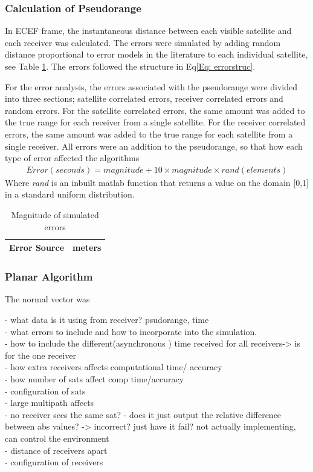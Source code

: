 \subsubsection{Calculation of Pseudorange}
In ECEF frame, the instantaneous distance between each visible satellite and each receiver was calculated. The errors were simulated by adding random distance proportional to error models in the literature to each individual satellite, see Table \ref{Table:mag errors}. The errors followed the structure in Eq\eqref{Eq: errorstruc}.

For the error analysis, the errors associated with the pseudorange were divided into three sections; satellite correlated errors, receiver correlated errors and random errors. For the satellite correlated errors, the same amount was added to the true range for each receiver from a single satellite. For the receiver correlated errors, the same amount was added to the true range for each satellite from a single receiver.  
All errors were an addition to the pseudorange, so that how each type of error affected the algorithms 
\begin{eqnarray}
Error(seconds) = magnitude + 10\times magnitude\times rand(elements) \label{Eq: errorstruc}
\end{eqnarray}
Where \textit{rand} is an inbuilt matlab function that returns a value on the domain [0,1] in a standard uniform distribution.

\begin{table}
\centering
\caption{Magnitude of simulated errors}
\label{Table:mag errors}
\begin{tabular}{|c|c|}
\hline
Error Source & meters \\\hline
\end{tabular}
\end{table}



\subsubsection{Planar Algorithm}
The normal vector was


- what data is it using from receiver? psudorange, time\\

- what errors to include and how to incorporate into the simulation.\\
- how to include the different(asynchronous ) time received for all receivers-> is for the one receiver \\
- how extra receivers affects computational time/ accuracy\\
- how number of sats affect comp time/accuracy\\
- configuration of sats\\
- large multipath affects\\
- no receiver sees the same sat? - does it just output the relative difference between abs values? -> incorrect? just have it fail? not actually implementing, can control the environment\\
- distance of receivers apart\\
- configuration of receivers


